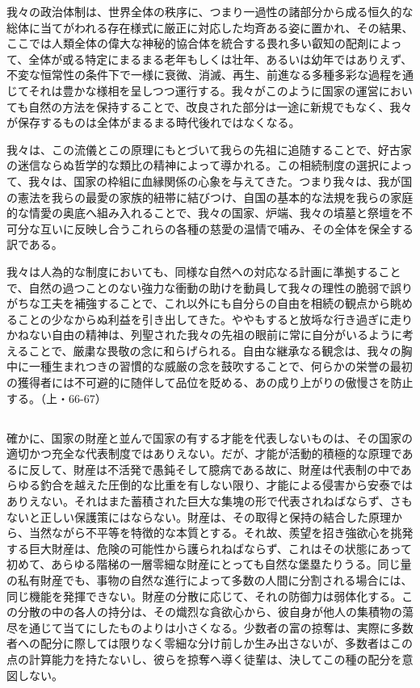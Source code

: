 我々の政治体制は、世界全体の秩序に、つまり一過性の諸部分から成る恒久的な総体に当てがわれる存在様式に厳正に対応した均斉ある姿に置かれ、その結果、ここでは人類全体の偉大な神秘的協合体を統合する畏れ多い叡知の配剤によって、全体が或る特定にまるまる老年もしくは壮年、あるいは幼年ではありえず、不変な恒常性の条件下で一様に衰微、消滅、再生、前進なる多種多彩な過程を通じてそれは豊かな様相を呈しつつ運行する。我々がこのように国家の運営においても自然の方法を保持することで、改良された部分は一途に新規でもなく、我々が保存するものは全体がまるまる時代後れではなくなる。

我々は、この流儀とこの原理にもとづいて我らの先祖に追随することで、好古家の迷信ならぬ哲学的な類比の精神によって導かれる。この相続制度の選択によって、我々は、国家の枠組に血縁関係の心象を与えてきた。つまり我々は、我が国の憲法を我らの最愛の家族的紐帯に結びつけ、自国の基本的な法規を我らの家庭的な情愛の奥底へ組み入れることで、我々の国家、炉端、我々の墳墓と祭壇を不可分な互いに反映し合うこれらの各種の慈愛の温情で哺み、その全体を保全する訳である。

我々は人為的な制度においても、同様な自然への対応なる計画に準拠することで、自然の過つことのない強力な衝動の助けを動員して我々の理性の脆弱で誤りがちな工夫を補強することで、これ以外にも自分らの自由を相続の観点から眺めることの少なからぬ利益を引き出してきた。ややもすると放埓な行き過ぎに走りかねない自由の精神は、列聖された我々の先祖の眼前に常に自分がいるように考えることで、厳粛な畏敬の念に和らげられる。自由な継承なる観念は、我々の胸中に一種生まれつきの習慣的な威厳の念を鼓吹することで、何らかの栄誉の最初の獲得者には不可避的に随伴して品位を貶める、あの成り上がりの傲慢さを防止する。（上・66-67）

\subsection{}



確かに、国家の財産と並んで国家の有する才能を代表しないものは、その国家の適切かつ充全な代表制度ではありえない。だが、才能が活動的積極的な原理であるに反して、財産は不活発で愚鈍そして臆病である故に、財産は代表制の中であらゆる釣合を越えた圧倒的な比重を有しない限り、才能による侵害から安泰ではありえない。それはまた蓄積された巨大な集塊の形で代表されねばならず、さもないと正しい保護策にはならない。財産は、その取得と保持の結合した原理から、当然ながら不平等を特徴的な本質とする。それ故、羨望を招き強欲心を挑発する巨大財産は、危険の可能性から護られねばならず、これはその状態にあって初めて、あらゆる階梯の一層零細な財産にとっても自然な堡塁たりうる。同じ量の私有財産でも、事物の自然な進行によって多数の人間に分割される場合には、同じ機能を発揮できない。財産の分散に応じて、それの防御力は弱体化する。この分散の中の各人の持分は、その熾烈な貪欲心から、彼自身が他人の集積物の蕩尽を通じて当てにしたものよりは小さくなる。少数者の富の掠奪は、実際に多数者への配分に際しては限りなく零細な分け前しか生み出さないが、多数者はこの点の計算能力を持たないし、彼らを掠奪へ導く徒輩は、決してこの種の配分を意図しない。

